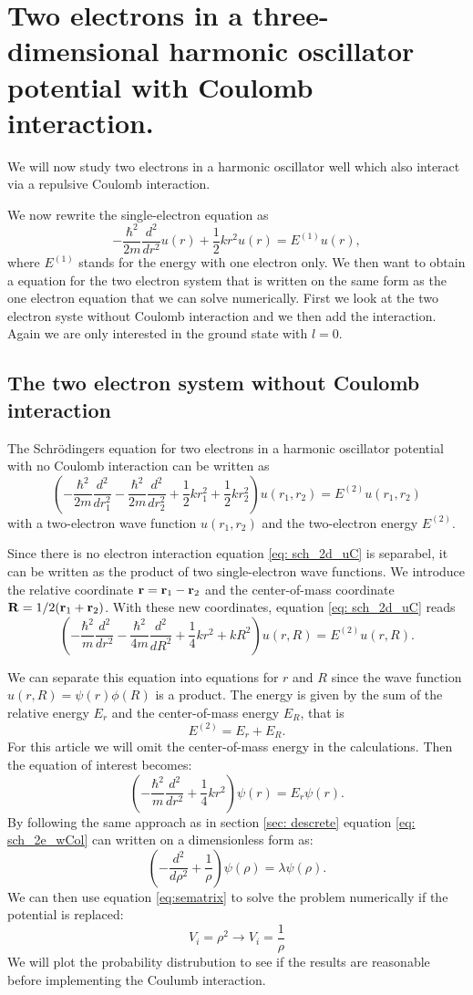 \documentclass[11pt,a4wide]{article}
\begin{document}
\section{Two electrons in a three-dimensional harmonic oscillator potential with Coulomb interaction.}
We will now study two electrons in a harmonic oscillator well which also interact via a repulsive Coulomb interaction.

We now rewrite the single-electron equation as
\[
  -\frac{\hbar^2}{2 m} \frac{d^2}{dr^2} u(r) 
       + \frac{1}{2}k r^2u(r)  = E^{(1)} u(r),
\]
where $E^{(1)}$ stands for the energy with one electron only. We then want to obtain a equation for the two electron system that is written on the same form as the one electron equation that we can solve numerically. First we look at the two electron syste without Coulomb interaction and we then add the interaction. Again we are only interested in the ground state with $l=0$. 

\subsection{The two electron system without Coulomb interaction}
The Schr\"odingers equation for two electrons in a harmonic oscillator potential with no Coulomb interaction can be written as
\begin{equation}
\left(  -\frac{\hbar^2}{2 m} \frac{d^2}{dr_1^2} -\frac{\hbar^2}{2 m} \frac{d^2}{dr_2^2}+ \frac{1}{2}k r_1^2+ \frac{1}{2}k r_2^2\right)u(r_1,r_2)  = E^{(2)} u(r_1,r_2) 
\label{eq: sch_2d_uC}
\end{equation}
with a two-electron wave function $u(r_1,r_2)$ and the two-electron energy $E^{(2)}$.

Since there is no electron interaction equation \ref{eq: sch_2d_uC} is separabel, it can be written as the product of two single-electron wave functions. We introduce the relative coordinate ${\bf r} = {\bf r}_1-{\bf r}_2$ and the center-of-mass coordinate ${\bf R} = 1/2({\bf r}_1+{\bf r}_2)$. With these new coordinates,  equation \ref{eq: sch_2d_uC} reads
\[
\left(  -\frac{\hbar^2}{m} \frac{d^2}{dr^2} -\frac{\hbar^2}{4 m} \frac{d^2}{dR^2}+ \frac{1}{4} k r^2+  kR^2\right)u(r,R)  = E^{(2)} u(r,R).
\]

We can separate this equation into equations for $r$ and $R$ since the wave function $u(r,R) = \psi(r)\phi(R)$ is a product. The energy is given by the sum of the relative energy $E_r$ and the center-of-mass energy $E_R$, that is
\[
E^{(2)}=E_r+E_R.
\]
For this article we will omit the center-of-mass energy in the calculations. Then the equation of interest becomes:
\[
\left(  -\frac{\hbar^2}{m} \frac{d^2}{dr^2}+ \frac{1}{4}k r^2\right)\psi(r)  = E_r \psi(r).
\]
By following the same approach as in section \ref{sec: descrete} equation \ref{eq: sch_2e_wCol} can written on a dimensionless form as:
\[
\left(  - \frac{d^2}{d\rho^2}+ \frac{1}{\rho}\right)\psi(\rho)  = \lambda\psi(\rho).
\]
We can then use equation \ref{eq:sematrix} to solve the problem numerically if the potential is replaced:
\[
V_i = \rho^2 \rightarrow V_i = \frac{1}{\rho}
\]
We will plot the probability distrubution to see if the results are reasonable before implementing the Coulumb interaction.
\end{document}
